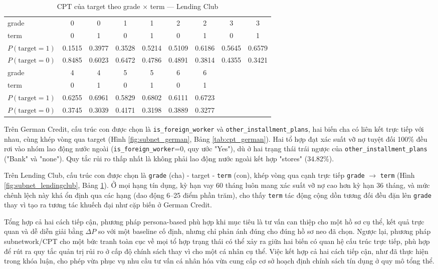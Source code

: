 \vspace{1em}
\begin{table}[htbp]
\centering
\caption{CPT của target theo grade × term --- Lending Club}
\label{tab:cpt_lendingclub}
\begin{tabular}{lcccccccc}
\toprule
grade & 0 & 0 & 1 & 1 & 2 & 2 & 3 & 3 \\
term  & 0 & 1 & 0 & 1 & 0 & 1 & 0 & 1 \\
\midrule
$P(\text{target}=1)$ & 0.1515 & 0.3977 & 0.3528 & 0.5214 & 0.5109 & 0.6186 & 0.5645 & 0.6579 \\
$P(\text{target}=0)$ & 0.8485 & 0.6023 & 0.6472 & 0.4786 & 0.4891 & 0.3814 & 0.4355 & 0.3421 \\
\midrule
grade & 4 & 4 & 5 & 5 & 6 & 6 & & \\
term  & 0 & 1 & 0 & 1 & 0 & 1 & & \\
\midrule
$P(\text{target}=1)$ & 0.6255 & 0.6961 & 0.5829 & 0.6802 & 0.6111 & 0.6723 & & \\
$P(\text{target}=0)$ & 0.3745 & 0.3039 & 0.4171 & 0.3198 & 0.3889 & 0.3277 & & \\
\bottomrule
\end{tabular}
\end{table}


\vspace{1em}
Trên German Credit, cấu trúc con được chọn là \texttt{is\_foreign\_worker} và \texttt{other\_installment\_plans}, hai biến cha có liên kết trực tiếp với nhau, cùng khép vòng qua target (Hình \ref{fig:subnet_german}, Bảng \ref{tab:cpt_german}). Hai tổ hợp đạt xác suất vỡ nợ tuyệt đối 100\% đều rơi vào nhóm lao động nước ngoài (\texttt{is\_foreign\_worker}=0, quy ước "Yes"), dù ở hai trạng thái trái ngược của \texttt{other\_installment\_plans} ("Bank" và "none"). Quy tắc rủi ro thấp nhất là không phải lao động nước ngoài kết hợp "stores" (34.82\%).

Trên Lending Club, cấu trúc con được chọn là \texttt{grade} (cha) - target - \texttt{term} (con), khép vòng qua cạnh trực tiếp \texttt{grade} $\rightarrow$ \texttt{term} (Hình \ref{fig:subnet_lendingclub}, Bảng \ref{tab:cpt_lendingclub}). Ở mọi hạng tín dụng, kỳ hạn vay 60 tháng luôn mang xác suất vỡ nợ cao hơn kỳ hạn 36 tháng, và mức chênh lệch này khá ổn định qua các hạng (dao động 6--25 điểm phần trăm), cho thấy \texttt{term} tác động cộng dồn tương đối đều đặn lên \texttt{grade} thay vì tạo ra tương tác khuếch đại như cặp biến ở German Credit.

Tổng hợp cả hai cách tiếp cận, phương pháp persona-based phù hợp khi mục tiêu là tư vấn can thiệp cho một hồ sơ cụ thể, kết quả trực quan và dễ diễn giải bằng $\Delta P$ so với một baseline cố định, nhưng chỉ phản ánh đúng cho đúng hồ sơ neo đã chọn. Ngược lại, phương pháp subnetwork/CPT cho một bức tranh toàn cục về mọi tổ hợp trạng thái có thể xảy ra giữa hai biến có quan hệ cấu trúc trực tiếp, phù hợp để rút ra quy tắc quản trị rủi ro ở cấp độ chính sách thay vì cho một cá nhân cụ thể. Việc kết hợp cả hai cách tiếp cận, như đã thực hiện trong khóa luận, cho phép vừa phục vụ nhu cầu tư vấn cá nhân hóa vừa cung cấp cơ sở hoạch định chính sách tín dụng ở quy mô tổng thể.


